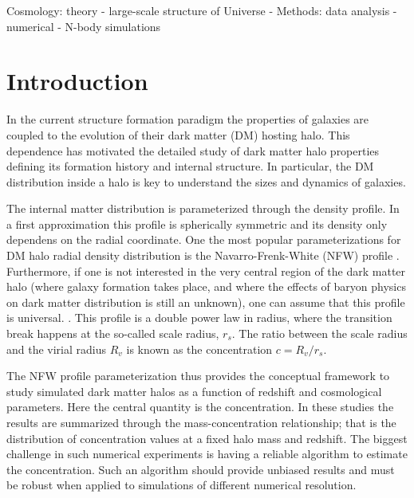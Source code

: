 \documentclass[a4,useAMS,usenatbib,usegraphicx]{mn2e}
\begin{document}
\begin{keywords}
Cosmology: theory - large-scale structure of Universe -
Methods: data analysis - numerical - N-body simulations
\end{keywords}


\section{Introduction}
\label{sec:introduction}
In the current structure formation paradigm the properties of galaxies
are coupled to the evolution of their dark matter (DM) hosting halo.
This dependence has motivated the detailed study of dark matter halo
properties defining its formation history and internal structure. 
In particular, the DM distribution inside a halo is key to
understand the sizes and dynamics of galaxies.


The internal matter distribution is parameterized through the density
profile. 
In a first approximation this profile is spherically symmetric and
its density only dependens on the radial coordinate. 
One the most popular parameterizations for DM halo radial
density distribution is the Navarro-Frenk-White (NFW) profile
\citep{NFW}.   
Furthermore, if one is not interested in the very central region of the
dark matter halo (where galaxy formation takes place, and where the
effects of baryon physics on dark matter distribution is still an
unknown), one can assume that this profile is universal.
\citep{Navarro2010}.  
 This profile is a double power law in radius, where the transition
break happens at the so-called scale radius, $r_s$.  
The ratio between the scale radius and the virial radius $R_v$ is
known as the concentration $c=R_v/r_s$. 


The NFW profile parameterization thus provides the conceptual
framework to study simulated dark matter halos as a function of
redshift and cosmological parameters.
Here the central quantity is the concentration. 
In these studies 
\citep{Neto2007,Maccio2008,Duffy2008,Munoz2011,Prada2012,Ludlow2014} 
the results are summarized through the
mass-concentration relationship; that is the distribution of
concentration values at a fixed halo mass and redshift.
The biggest challenge in such numerical experiments is having a
reliable algorithm to estimate the concentration. 
Such an algorithm should provide unbiased results and must be robust
when applied to simulations of different numerical resolution.  
\end{document}
